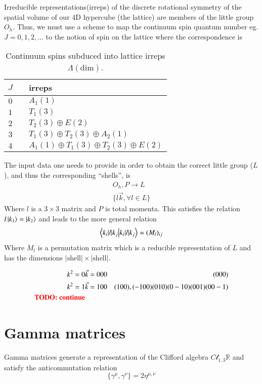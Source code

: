  Irreducible representations(irreps) of the discrete rotational symmetry of the spatial volume of our 4D hypercube (the lattice) are members of the little group $O_h$. Thus, we must use a scheme to map the continuum spin quantum number eg. $J=0,1,2,\dots$ to the notion of spin on the lattice where the correspondence is \cite{Dudek_2010}
\begin{table}
    \begin{tabular}{ccl}
    $J$ & & irreps \\
    \hline
    $0$ & & $A_1(1)$ \\
    $1$ & & $T_1(3)$ \\
    $2$ & & $T_2(3) \oplus E(2)$\\
    $3$ & & $T_1(3) \oplus T_2(3) \oplus A_2(1)$\\
    $4$ & & $A_1(1) \oplus T_1(3) \oplus T_2(3) \oplus E(2)$
\end{tabular}
\caption{Continuum spins subduced into lattice irreps $\Lambda(\mathrm{dim})$.}
\label{Table:Subduce}
\end{table}
    
The input data one needs to provide in order to obtain the correct little group ($L$), and thus the corresponding ``shells'', is 
\begin{align}
    O_h,P \rightarrow L \\
    \{l\vec{k}, \forall l \in L\}
\end{align}
Where $l$ is a $3\times3$ matrix and $P$ is total momenta. This satisfies the relation $l\ket{k_1} = \ket{k_2}$ and leads to the more general relation 
\begin{align}
    \braket{k_i|l|k_j} = (M_l)_{ij}
\end{align} 
Where $M_l$ is a permutation matrix which is a reducible representation of $L$ and has the dimensions $|\text{shell}| \times |\text{shell}|$. 

\begin{align}
    k^2 = 0 & \vec{k} = 000 & {(000)} \\
    k^2 = 1 & \vec{k}=100 & {(100),(-100)(010)(0-10)(001)(00-1)} \\
    \textbf{\color{red}TODO: continue}
\end{align}


\section{Gamma matrices}
Gamma matrices generate a representation of the Clifford algebra $C\mathcal{l}_{1,3}\mathbb{R}$ and satisfy the anticommutation relation 
\begin{equation}
    \{\gamma^\mu,\gamma^\nu \} = 2\eta^{\mu,\nu}
\end{equation}

